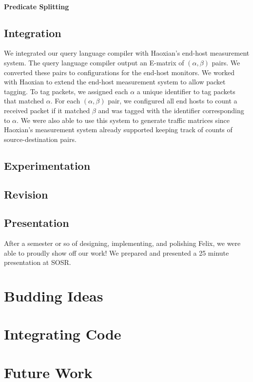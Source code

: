 \paragraph{Predicate Splitting}

\subsection{Integration}
We integrated our query language compiler with Haoxian's end-host measurement
system. The query language compiler output an E-matrix of $(\alpha, \beta)$
pairs. We converted these pairs to configurations for the end-host monitors. We
worked with Haoxian to extend the end-host measurement system to allow packet
tagging. To tag packets, we assigned each $\alpha$ a unique identifier to tag
packets that matched $\alpha$. For each $(\alpha, \beta)$ pair, we configured
all end hosts to count a received packet if it matched $\beta$ and was tagged
with the identifier corresponding to $\alpha$.  We were also able to use this
system to generate traffic matrices since Haoxian's measurement system already
supported keeping track of counts of source-destination pairs.

\subsection{Experimentation}

\subsection{Revision}

\subsection{Presentation}
After a semester or so of designing, implementing, and polishing Felix, we were
able to proudly show off our work! We prepared and presented a 25 minute
presentation at SOSR.

\section{Budding Ideas}

\section{Integrating Code}

\section{Future Work}
